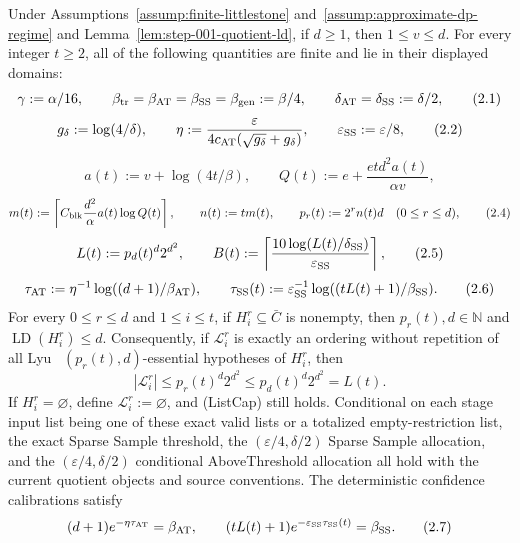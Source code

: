 \begin{lemma}\label{lem:step-001-calibration}
Under Assumptions~\ref{assump:finite-littlestone}
and~\ref{assump:approximate-dp-regime} and
Lemma~\ref{lem:step-001-quotient-ld}, if \(d\ge1\), then
\(1\le v\le d\). For every integer \(t\ge2\), all of the following
quantities are finite and lie in their displayed domains:
\[
\gamma:=\alpha/16,
\qquad
\beta_{\rm tr}=\beta_{\rm AT}=\beta_{\rm SS}=\beta_{\rm gen}:=\beta/4,
\qquad
\delta_{\rm AT}=\delta_{\rm SS}:=\delta/2,
\tag{2.1}
\]
\[
g_\delta:=\log(4/\delta),
\qquad
\eta:=\frac{\varepsilon}
{4c_{\rm AT}(\sqrt{g_\delta}+g_\delta)},
\qquad
\varepsilon_{\rm SS}:=\varepsilon/8,
\tag{2.2}
\]
\[
a(t):=v+\log(4t/\beta),
\qquad
Q(t):=e+\frac{etd^2a(t)}{\alpha v},
\tag{2.3}
\]
\[
m(t):=\left\lceil
C_{\rm blk}\frac{d^2}{\alpha}a(t)\log Q(t)
\right\rceil,
\qquad n(t):=tm(t),
\qquad p_r(t):=2^rn(t)d\quad(0\le r\le d),
\tag{2.4}
\]
\[
L(t):=p_d(t)^d2^{d^2},
\qquad
B(t):=\left\lceil
\frac{10\log(L(t)/\delta_{\rm SS})}{\varepsilon_{\rm SS}}
\right\rceil,
\tag{2.5}
\]
\[
\tau_{\rm AT}:=\eta^{-1}
\log((d+1)/\beta_{\rm AT}),
\qquad
\tau_{\rm SS}(t):=\varepsilon_{\rm SS}^{-1}
\log((tL(t)+1)/\beta_{\rm SS}).
\tag{2.6}
\]
For every \(0\le r\le d\) and \(1\le i\le t\), if
\(H_i^r\subseteq\bar C\) is nonempty, then
\(p_r(t),d\in\mathbb N\) and
\(\operatorname{LD}(H_i^r)\le d\). Consequently, if
\(\mathcal L_i^r\) is exactly an ordering without repetition of all Lyu~\citep{lyu2025}
\((p_r(t),d)\)-essential hypotheses of \(H_i^r\), then
\[
|\mathcal L_i^r|
\le p_r(t)^d2^{d^2}
\le p_d(t)^d2^{d^2}
=L(t).
\tag{ListCap}
\]
If \(H_i^r=\varnothing\), define \(\mathcal L_i^r:=\varnothing\), and
(ListCap) still holds. Conditional on each stage input list being one of
these exact valid lists or a totalized empty-restriction list, the
exact Sparse Sample threshold, the
\((\varepsilon/4,\delta/2)\) Sparse Sample allocation, and the
\((\varepsilon/4,\delta/2)\) conditional AboveThreshold allocation all hold
with the current quotient objects and source conventions. The deterministic
confidence calibrations satisfy
\[
(d+1)e^{-\eta\tau_{\rm AT}}=\beta_{\rm AT},
\qquad
(tL(t)+1)e^{-\varepsilon_{\rm SS}\tau_{\rm SS}(t)}=\beta_{\rm SS}.
\tag{2.7}
\]


\end{lemma}

